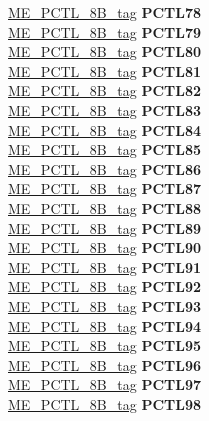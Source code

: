 \begin{DoxyCompactItemize}
\begin{tabbing}
\>\>\mbox{\hyperlink{unionME__PCTL__8B__tag}{ME\_PCTL\_8B\_tag}} {\bfseries PCTL78}\\
\>\>\mbox{\hyperlink{unionME__PCTL__8B__tag}{ME\_PCTL\_8B\_tag}} {\bfseries PCTL79}\\
\>\>\mbox{\hyperlink{unionME__PCTL__8B__tag}{ME\_PCTL\_8B\_tag}} {\bfseries PCTL80}\\
\>\>\mbox{\hyperlink{unionME__PCTL__8B__tag}{ME\_PCTL\_8B\_tag}} {\bfseries PCTL81}\\
\>\>\mbox{\hyperlink{unionME__PCTL__8B__tag}{ME\_PCTL\_8B\_tag}} {\bfseries PCTL82}\\
\>\>\mbox{\hyperlink{unionME__PCTL__8B__tag}{ME\_PCTL\_8B\_tag}} {\bfseries PCTL83}\\
\>\>\mbox{\hyperlink{unionME__PCTL__8B__tag}{ME\_PCTL\_8B\_tag}} {\bfseries PCTL84}\\
\>\>\mbox{\hyperlink{unionME__PCTL__8B__tag}{ME\_PCTL\_8B\_tag}} {\bfseries PCTL85}\\
\>\>\mbox{\hyperlink{unionME__PCTL__8B__tag}{ME\_PCTL\_8B\_tag}} {\bfseries PCTL86}\\
\>\>\mbox{\hyperlink{unionME__PCTL__8B__tag}{ME\_PCTL\_8B\_tag}} {\bfseries PCTL87}\\
\>\>\mbox{\hyperlink{unionME__PCTL__8B__tag}{ME\_PCTL\_8B\_tag}} {\bfseries PCTL88}\\
\>\>\mbox{\hyperlink{unionME__PCTL__8B__tag}{ME\_PCTL\_8B\_tag}} {\bfseries PCTL89}\\
\>\>\mbox{\hyperlink{unionME__PCTL__8B__tag}{ME\_PCTL\_8B\_tag}} {\bfseries PCTL90}\\
\>\>\mbox{\hyperlink{unionME__PCTL__8B__tag}{ME\_PCTL\_8B\_tag}} {\bfseries PCTL91}\\
\>\>\mbox{\hyperlink{unionME__PCTL__8B__tag}{ME\_PCTL\_8B\_tag}} {\bfseries PCTL92}\\
\>\>\mbox{\hyperlink{unionME__PCTL__8B__tag}{ME\_PCTL\_8B\_tag}} {\bfseries PCTL93}\\
\>\>\mbox{\hyperlink{unionME__PCTL__8B__tag}{ME\_PCTL\_8B\_tag}} {\bfseries PCTL94}\\
\>\>\mbox{\hyperlink{unionME__PCTL__8B__tag}{ME\_PCTL\_8B\_tag}} {\bfseries PCTL95}\\
\>\>\mbox{\hyperlink{unionME__PCTL__8B__tag}{ME\_PCTL\_8B\_tag}} {\bfseries PCTL96}\\
\>\>\mbox{\hyperlink{unionME__PCTL__8B__tag}{ME\_PCTL\_8B\_tag}} {\bfseries PCTL97}\\
\>\>\mbox{\hyperlink{unionME__PCTL__8B__tag}{ME\_PCTL\_8B\_tag}} {\bfseries PCTL98}\\

\end{tabbing}
\end{DoxyCompactItemize}
